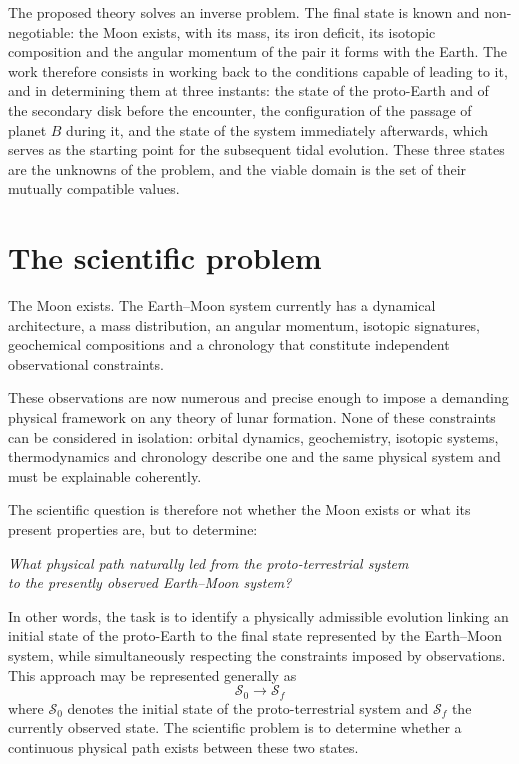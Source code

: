 \documentclass[11pt,a4paper,openany]{report}
\begin{document}
The proposed theory solves an inverse problem. The final state is known and non-negotiable: the
Moon exists, with its mass, its iron deficit, its isotopic composition and the angular momentum of
the pair it forms with the Earth. The work therefore consists in working back to the conditions
capable of leading to it, and in determining them at three instants: the state of the proto-Earth
and of the secondary disk before the encounter, the configuration of the passage of planet $B$
during it, and the state of the system immediately afterwards, which serves as the starting point
for the subsequent tidal evolution. These three states are the unknowns of the problem, and the
viable domain is the set of their mutually compatible values.
\label{ch:probleme}

\section{The scientific problem}

The Moon exists. The Earth--Moon system currently has a dynamical architecture, a mass
distribution, an angular momentum, isotopic signatures, geochemical compositions and a chronology
that constitute independent observational constraints.

These observations are now numerous and precise enough to impose a demanding physical framework
on any theory of lunar formation. None of these constraints can be considered in isolation:
orbital dynamics, geochemistry, isotopic systems, thermodynamics and chronology describe one and
the same physical system and must be explainable coherently.

The scientific question is therefore not whether the Moon exists or what its present properties
are, but to determine:

\begin{center}
\emph{What physical path naturally led from the proto-terrestrial system\\ to the presently observed
Earth--Moon system?}
\end{center}

In other words, the task is to identify a physically admissible evolution linking an initial state
of the proto-Earth to the final state represented by the Earth--Moon system, while simultaneously
respecting the constraints imposed by observations. This approach may be represented generally as
\begin{equation}
\boxed{\;\mathcal{S}_0\longrightarrow\mathcal{S}_f\;}
\label{eq:S0Sf}
\end{equation}
where $\mathcal{S}_0$ denotes the initial state of the proto-terrestrial system and
$\mathcal{S}_f$ the currently observed state. The scientific problem is to determine whether a
continuous physical path exists between these two states.
\end{document}
